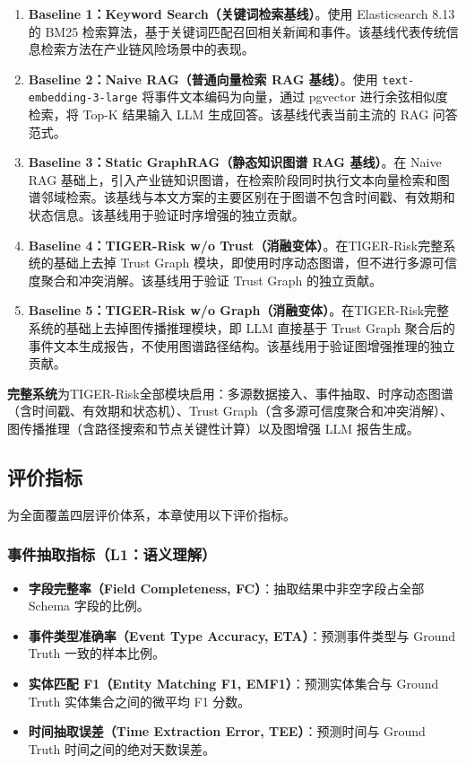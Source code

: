 \documentclass[12pt,a4paper]{article}
\newcommand{\projectshort}{TIGER-Risk}
\newcommand{\term}[1]{\textbf{#1}}
\begin{document}
\begin{enumerate}
    \item \term{Baseline 1：Keyword Search（关键词检索基线）}。使用 Elasticsearch 8.13 的 BM25 检索算法，基于关键词匹配召回相关新闻和事件。该基线代表传统信息检索方法在产业链风险场景中的表现。
    \item \term{Baseline 2：Naive RAG（普通向量检索 RAG 基线）}。使用 \texttt{text-embedding-3-large} 将事件文本编码为向量，通过 pgvector 进行余弦相似度检索，将 Top-K 结果输入 LLM 生成回答。该基线代表当前主流的 RAG 问答范式。
    \item \term{Baseline 3：Static GraphRAG（静态知识图谱 RAG 基线）}。在 Naive RAG 基础上，引入产业链知识图谱，在检索阶段同时执行文本向量检索和图谱邻域检索。该基线与本文方案的主要区别在于图谱不包含时间戳、有效期和状态信息。该基线用于验证时序增强的独立贡献。
    \item \term{Baseline 4：TIGER-Risk w/o Trust（消融变体）}。在\projectshort 完整系统的基础上去掉 Trust Graph 模块，即使用时序动态图谱，但不进行多源可信度聚合和冲突消解。该基线用于验证 Trust Graph 的独立贡献。
    \item \term{Baseline 5：TIGER-Risk w/o Graph（消融变体）}。在\projectshort 完整系统的基础上去掉图传播推理模块，即 LLM 直接基于 Trust Graph 聚合后的事件文本生成报告，不使用图谱路径结构。该基线用于验证图增强推理的独立贡献。
\end{enumerate}

\textbf{完整系统}为\projectshort 全部模块启用：多源数据接入、事件抽取、时序动态图谱（含时间戳、有效期和状态机）、Trust Graph（含多源可信度聚合和冲突消解）、图传播推理（含路径搜索和节点关键性计算）以及图增强 LLM 报告生成。

\subsection{评价指标}
\label{sec:exp-metrics}

为全面覆盖四层评价体系，本章使用以下评价指标。

\subsubsection{事件抽取指标（L1：语义理解）}

\begin{itemize}
    \item \term{字段完整率（Field Completeness, FC）}：抽取结果中非空字段占全部 Schema 字段的比例。
    \item \term{事件类型准确率（Event Type Accuracy, ETA）}：预测事件类型与 Ground Truth 一致的样本比例。
    \item \term{实体匹配 F1（Entity Matching F1, EMF1）}：预测实体集合与 Ground Truth 实体集合之间的微平均 F1 分数。
    \item \term{时间抽取误差（Time Extraction Error, TEE）}：预测时间与 Ground Truth 时间之间的绝对天数误差。
\end{itemize}
\end{document}
